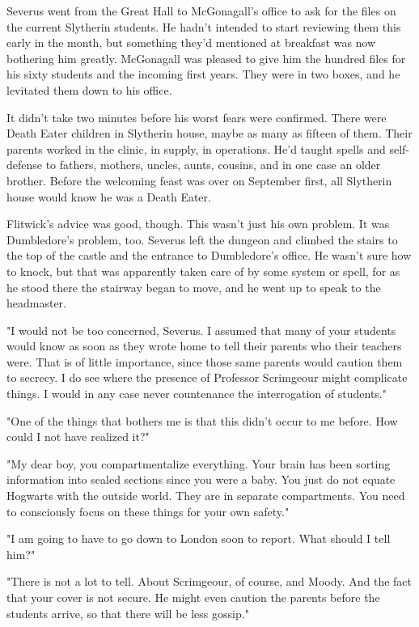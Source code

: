 \documentclass[a4paper,11pt]{article}
\begin{document}
Severus went from the Great Hall to McGonagall's office to ask for the files on the current Slytherin students. He hadn't intended to start reviewing them this early in the month, but something they'd mentioned at breakfast was now bothering him greatly. McGonagall was pleased to give him the hundred files for his sixty students and the incoming first years. They were in two boxes, and he levitated them down to his office.

It didn't take two minutes before his worst fears were confirmed. There were Death Eater children in Slytherin house, maybe as many as fifteen of them. Their parents worked in the clinic, in supply, in operations. He'd taught spells and self-defense to fathers, mothers, uncles, aunts, cousins, and in one case an older brother. Before the welcoming feast was over on September first, all Slytherin house would know he was a Death Eater.

Flitwick's advice was good, though. This wasn't just his own problem. It was Dumbledore's problem, too. Severus left the dungeon and climbed the stairs to the top of the castle and the entrance to Dumbledore's office. He wasn't sure how to knock, but that was apparently taken care of by some system or spell, for as he stood there the stairway began to move, and he went up to speak to the headmaster.

"I would not be too concerned, Severus. I assumed that many of your students would know as soon as they wrote home to tell their parents who their teachers were. That is of little importance, since those same parents would caution them to secrecy. I do see where the presence of Professor Scrimgeour might complicate things. I would in any case never countenance the interrogation of students."

"One of the things that bothers me is that this didn't occur to me before. How could I not have realized it?"

"My dear boy, you compartmentalize everything. Your brain has been sorting information into sealed sections since you were a baby. You just do not equate Hogwarts with the outside world. They are in separate compartments. You need to consciously focus on these things for your own safety."

"I am going to have to go down to London soon to report. What should I tell him?"

"There is not a lot to tell. About Scrimgeour, of course, and Moody. And the fact that your cover is not secure. He might even caution the parents before the students arrive, so that there will be less gossip."
\end{document}
